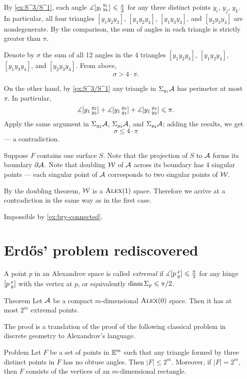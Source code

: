By \ref{ex:S^3/S^1}, each angle $\measuredangle[y_i\,{}^{y_j}_{y_k}]\leqslant \tfrac\pi2$ for any three distinct points 
$y_i$, $y_j$, $y_k$.
In particular, all four triangles $[y_1y_2y_3]$, $[y_1y_2y_4]$, $[y_1y_3y_4]$, and $[y_2y_3y_4]$ are nondegenerate.
By the comparison, the sum of angles in each triangle is strictly greater than $\pi$.

Denote by $\sigma$ the sum of all 12 angles in the 4 triangles $[y_1y_2y_3]$, $[y_1y_2y_4]$, $[y_1y_3y_4]$, and $[y_2y_3y_4]$.
From above,
\[\sigma>4\cdot\pi.\]

On the other hand, by \ref{ex:S^3/S^1} any triangle in $\Sigma_{y_1}\mathcal{A}$ has perimeter at most $\pi$.
In particular, 
\[\measuredangle[y_1\,{}^{y_2}_{y_3}]+\measuredangle[y_1\,{}^{y_3}_{y_4}]+\measuredangle[y_1\,{}^{y_4}_{y_2}]\leqslant \pi.\]
Apply the same argument in $\Sigma_{y_2}\mathcal{A}$, $\Sigma_{y_3}\mathcal{A}$, and $\Sigma_{y_4}\mathcal{A}$;
adding the results, we get 
\[\sigma\le 4\cdot\pi\]
--- a contradiction.

Suppose $F$ contains one surface $S$.
Note that the projection of $S$ to $\mathcal{A}$ forms its boundary $\partial \mathcal{A}$.
Note that doubling $\mathcal{W}$ of $\mathcal{A}$ across its boundary has 4 singular points --- each singular point of $\mathcal{A}$ corresponds to two singular points of $\mathcal{W}$.

By the doubling theorem, $\mathcal{W}$ is a $\textsc{Alex}(1)$ space.
Therefore we arrive at a contradiction in the same way as in the first case.

 Impossible by \ref{ex:bry-connected}.
\qeds

\section{Erdős' problem rediscovered}

A point $p$ in an Alexandrov space is called \emph{extremal} if $\measuredangle[p\,{}^{x}_{y}]\leqslant \tfrac\pi2$ for any hinge $[p\,{}^{x}_{y}]$ with the vertex at $p$, or equivalently $\operatorname{\rm diam}\nolimits \Sigma_p\leqslant \pi/2$.

\begin{thm}{Theorem}\label{thm:extr-point}
Let $\mathcal{A}$ be a compact $m$-dimensional $\textsc{Alex}(0)$ space.
Then it has at most $2^m$ extremal points.
\end{thm}

The proof is a translation of the proof of the following classical problem in discrete geometry to Alexandrov's language.

\begin{thm}{Problem}\label{erdos-problem}
Let $F$ be a set of points in $\mathbb{E}^m$ such that any triangle formed by three distinct points in $F$ has no obtuse angles.
Then  $|F|\le2^m$.
Moreover, if $|F|=2^m$, then $F$ consists of the vertices of an $m$-dimensional rectangle.
\end{thm}

